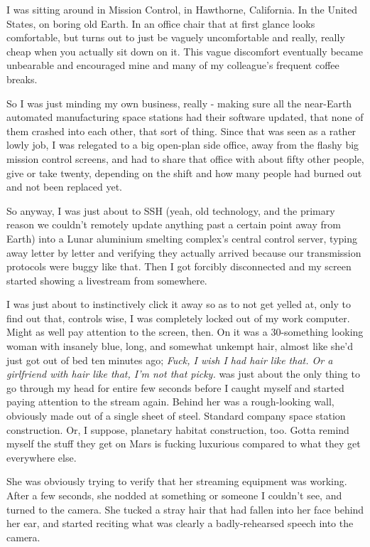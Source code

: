 I was sitting around in Mission Control, in Hawthorne, California.
In the United States, on boring old Earth. In an office chair that at first
glance looks comfortable, but turns out to just be vaguely uncomfortable and
really, really cheap when you actually sit down on it. This vague discomfort
eventually became unbearable and encouraged mine and many of my colleague's
frequent coffee breaks.

So I was just minding my own business, really - making sure all the near-Earth
automated manufacturing space stations had their software updated, that none of
them crashed into each other, that sort of thing. Since that was seen as a
rather lowly job, I was relegated to a big open-plan side office, away from the
flashy big mission control screens, and had to share that office with about
fifty other people, give or take twenty, depending on the shift and how many
people had burned out and not been replaced yet.

So anyway, I was just about to SSH (yeah, old technology, and the primary reason
we couldn't remotely update anything past a certain point away from Earth) into
a Lunar aluminium smelting complex's central control server, typing away letter
by letter and verifying they actually arrived because our transmission protocols
were buggy like that. Then I got forcibly disconnected and my screen started
showing a livestream from somewhere.

I was just about to instinctively click it
away so as to not get yelled at, only to find out that, controls wise, I was
completely locked out of my work computer. Might as well pay attention to the
screen, then. On it was a 30-something looking woman with insanely blue, long,
and somewhat unkempt hair, almost like she'd just got out of bed ten minutes
ago; \textit{Fuck, I wish I had hair like that. Or a girlfriend with hair like
  that, I'm not that picky.} was just about the only thing to go through my head
for entire few seconds before I caught myself and started paying attention to
the stream again. Behind her was a rough-looking wall, obviously made out of a
single sheet of steel. Standard company space station construction. Or, I
suppose, planetary habitat construction, too. Gotta remind myself the stuff they
get on Mars is fucking luxurious compared to what they get everywhere else.

She was obviously trying to verify that her streaming equipment was working.
After a few seconds, she nodded at something or someone I couldn't see,
and turned to the camera. She tucked a stray hair that had fallen into her face
behind her ear, and started reciting what was clearly
a badly-rehearsed speech into the camera.

